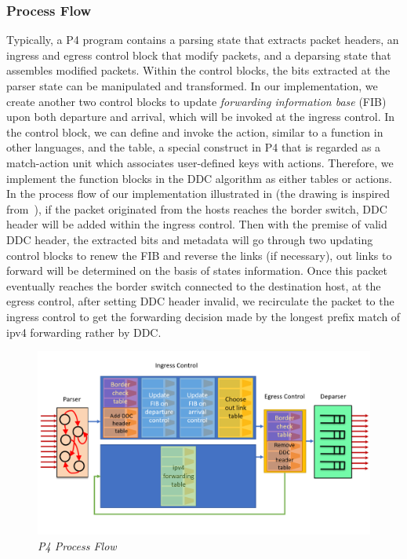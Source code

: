 \subsubsection{Process Flow}
Typically, a P4 program contains a parsing state that extracts packet headers, an ingress and egress control block that modify packets, and a deparsing state that assembles modified packets. Within the control blocks, the bits extracted at the parser state can be manipulated and transformed. In our implementation, we create another two control blocks to update \textit{forwarding information base} (FIB) upon both departure and arrival, which will be invoked at the ingress control. In the control block, we can define and invoke the action, similar to a function in other languages, and the table, a special construct in P4 that is regarded as a match-action unit which associates user-defined keys with actions. Therefore, we implement the function blocks in the DDC algorithm as either tables or actions. \\
In the process flow of our implementation illustrated in  (the drawing is inspired from~\cite{CS344}), if the packet originated from the hosts reaches the border switch, DDC header will be added within the ingress control. Then with the premise of valid DDC header, the extracted bits and metadata will go through two updating control blocks to renew the FIB and reverse the links (if necessary), out links to forward will be determined on the basis of states information. Once this packet eventually reaches the border switch connected to the destination host, at the egress control, after setting DDC header invalid, we recirculate the packet to the ingress control to get the forwarding decision made by the longest prefix match of ipv4 forwarding rather by DDC.

\begin{figure}[H]
      \centering \includegraphics[scale=0.44]{pictures/process flow.png}
      \caption{\it{P4 Process Flow}}
      \label{fig:p4Process}
\end{figure}


